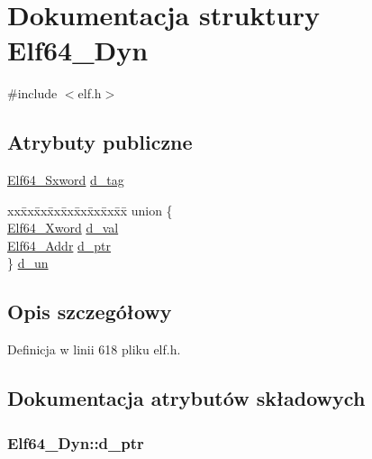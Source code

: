 \hypertarget{struct_elf64___dyn}{\section{Dokumentacja struktury Elf64\-\_\-\-Dyn}
\label{struct_elf64___dyn}
}


{\ttfamily \#include $<$elf.\-h$>$}

\subsection*{Atrybuty publiczne}
\begin{DoxyCompactItemize}
\item 
\hyperlink{elf_8h_a5b450442210b3d21567662fb96ac9a02}{Elf64\-\_\-\-Sxword} \hyperlink{struct_elf64___dyn_a74a63e5acb7d8ddc946a5b0c5eb3c26a}{d\-\_\-tag}
\item 
\begin{tabbing}
xx\=xx\=xx\=xx\=xx\=xx\=xx\=xx\=xx\=\kill
union \{\\
\>\hyperlink{elf_8h_a5447a48a3dae0bd24f606415268c6fe4}{Elf64\_Xword} \hyperlink{struct_elf64___dyn_ab1741378fc34cbcc8caf3f7bb5e6de18}{d\_val}\\
\>\hyperlink{elf_8h_aeed51d08e3a950d637f8ec1f0cd4ef65}{Elf64\_Addr} \hyperlink{struct_elf64___dyn_a4820e579b624438f02827e7b44fbd0f7}{d\_ptr}\\
\} \hyperlink{struct_elf64___dyn_acc39d52f3a8efd552afa2e3369c03215}{d\_un}\\

\end{tabbing}\end{DoxyCompactItemize}


\subsection{Opis szczegółowy}


Definicja w linii 618 pliku elf.\-h.



\subsection{Dokumentacja atrybutów składowych}
\hypertarget{struct_elf64___dyn_a4820e579b624438f02827e7b44fbd0f7}{
\subsubsection[{d\-\_\-ptr}]{ Elf64\-\_\-\-Dyn\-::d\-\_\-ptr}}\label{struct_elf64___dyn_a4820e579b624438f02827e7b44fbd0f7}


